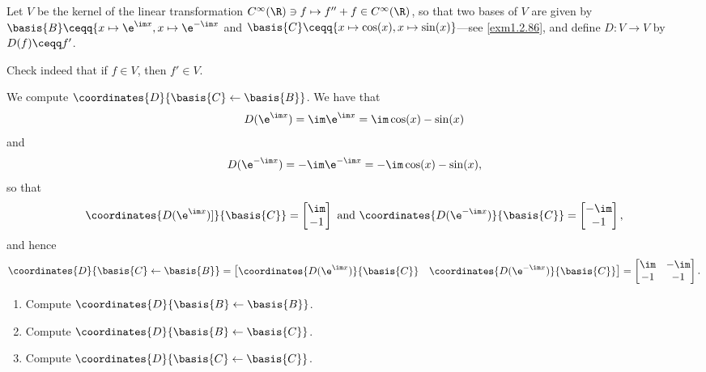 \begin{exm}{}{}
	Let $V$ be the kernel of the linear transformation $C^{\infty}(\R )\ni f\mapsto f''+f\in C^{\infty}(\R )$, so that two bases of $V$ are given by $\basis{B}\ceqq \{ x\mapsto \e ^{\im x},x\mapsto \e ^{-\im x}$ and $\basis{C}\ceqq \{ x\mapsto \cos (x),x\mapsto \sin (x)\}$---see \cref{exm1.2.86}, and define $D\colon V\rightarrow V$ by $D(f)\ceqq f'$.
	\begin{exr}[breakable=false]{}{}
		Check indeed that if $f\in V$, then $f'\in V$.
	\end{exr}
	
	We compute $\coordinates{D}{\basis{C}\leftarrow \basis{B}}$.  We have that
	\begin{equation}
		D(\e ^{\im x})=\im \e ^{\im x}=\im \cos (x)-\sin (x)
	\end{equation}
	and
	\begin{equation}
		D(\e ^{-\im x})=-\im \e ^{-\im x}=-\im \cos (x)-\sin (x),
	\end{equation}
	so that
	\begin{equation}
		\coordinates{D(\e ^{\im x})]}{\basis{C}}=\begin{bmatrix}\im \\ -1\end{bmatrix}\text{ and }\coordinates{D(\e ^{-\im x})}{\basis{C}}=\begin{bmatrix}-\im \\ -1\end{bmatrix},
	\end{equation}
	and hence
	\begin{equation}
		\coordinates{D}{\basis{C}\leftarrow \basis{B}}=\begin{bmatrix}\coordinates{D(\e ^{\im x})}{\basis{C}} & \coordinates{D(\e ^{-\im x})}{\basis{C}}\end{bmatrix}=\begin{bmatrix}\im & -\im \\ -1 & -1\end{bmatrix}.
	\end{equation}
	
	\begin{exr}[breakable=false]{}{}
		\begin{enumerate}
			\item Compute $\coordinates{D}{\basis{B}\leftarrow \basis{B}}$.
			\item Compute $\coordinates{D}{\basis{B}\leftarrow \basis{C}}$.
			\item Compute $\coordinates{D}{\basis{C}\leftarrow \basis{C}}$.
		\end{enumerate}
	\end{exr}
\end{exm}


